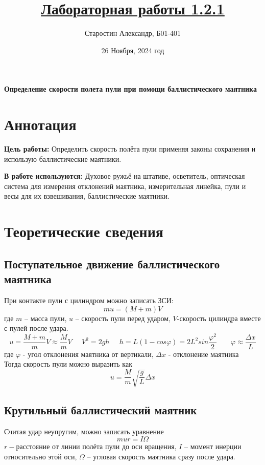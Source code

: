 \documentclass[a4paper]{article}
\title{\underline{Лабораторная работы 1.2.1}}
\author{Старостин Александр, Б01-401}
\date {26 Ноября, 2024 год}
\begin{document}
\maketitle
\newpage

\textbf{Определение скорости полета пули при помощи баллистического маятника}

\section{Аннотация}
    \par \textbf{Цель работы:} Определить скорость полёта пули применяя законы сохранения и использую баллистические маятники.\\

    \par \textbf{В работе используются:} Духовое ружьё на штативе, осветитель, оптическая система для измерения отклонений маятника, измерительная линейка, пули и весы для их взвешивания, баллистические маятники.


\section{Теоретические сведения}

\subsection{Поступательное движение баллистического маятника}
При контакте пули с цилиндром можно записать ЗСИ:
	\begin{equation}
		 mu = (M+m)V
	\end{equation}
	где $m$ -- масса пули, $u$ -- скорость пули перед ударом, $V$-скорость цилиндра вместе с пулей после удара.
	\begin{equation}
		u=\frac{M+m}{m}V \approx \frac{M}{m}V \;\;\;\;\; V^2=2gh \;\;\;\;\; h = L(1-cos \varphi ) = 2L^2 sin \frac{\varphi^2}{2} \;\;\;\;\;\;\; \varphi \approx \frac{\Delta x}{L}
	\end{equation}
        где $\varphi$ - угол отклонения маятника от вертикали, $\Delta x$ - отклонение маятника\\
	Тогда скорость пули можно выразить как
	\begin{equation} \label{vel1}
	 u=\frac{M}{m} \sqrt{\frac{g}{L}} \Delta x
	\end{equation}

\subsection{Крутильный баллистический маятник}
Считая удар неупругим, можно записать уравнение
	$$mur=I \Omega$$
	$r-$расстояние от линии полёта пули до оси вращения, $I$ -- момент инерции относительно этой оси, $\Omega$ -- угловая скорость маятника сразу после удара.
\end{document}
